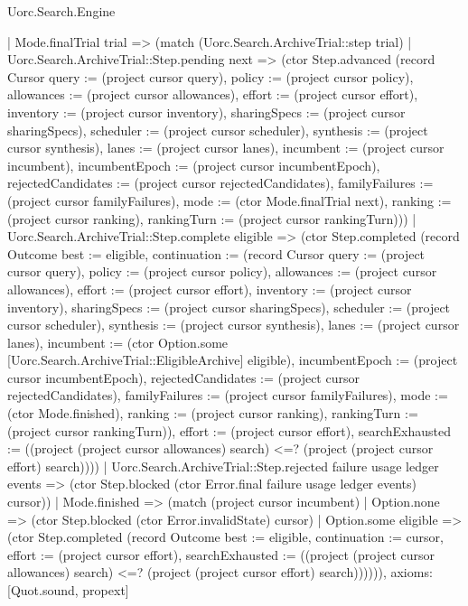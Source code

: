 \begin{lexlean}{Uorc.Search.Engine}
\begin{semanticmodule}
{    | Mode.finalTrial trial => (match (Uorc.Search.ArchiveTrial::step trial)
      | Uorc.Search.ArchiveTrial::Step.pending next => (ctor Step.advanced (record Cursor {query := (project cursor query), policy := (project cursor policy), allowances := (project cursor allowances), effort := (project cursor effort), inventory := (project cursor inventory), sharingSpecs := (project cursor sharingSpecs), scheduler := (project cursor scheduler), synthesis := (project cursor synthesis), lanes := (project cursor lanes), incumbent := (project cursor incumbent), incumbentEpoch := (project cursor incumbentEpoch), rejectedCandidates := (project cursor rejectedCandidates), familyFailures := (project cursor familyFailures), mode := (ctor Mode.finalTrial next), ranking := (project cursor ranking), rankingTurn := (project cursor rankingTurn)}))
      | Uorc.Search.ArchiveTrial::Step.complete eligible => (ctor Step.completed (record Outcome {best := eligible, continuation := (record Cursor {query := (project cursor query), policy := (project cursor policy), allowances := (project cursor allowances), effort := (project cursor effort), inventory := (project cursor inventory), sharingSpecs := (project cursor sharingSpecs), scheduler := (project cursor scheduler), synthesis := (project cursor synthesis), lanes := (project cursor lanes), incumbent := (ctor Option.some [Uorc.Search.ArchiveTrial::EligibleArchive] eligible), incumbentEpoch := (project cursor incumbentEpoch), rejectedCandidates := (project cursor rejectedCandidates), familyFailures := (project cursor familyFailures), mode := (ctor Mode.finished), ranking := (project cursor ranking), rankingTurn := (project cursor rankingTurn)}), effort := (project cursor effort), searchExhausted := ((project (project cursor allowances) search) <=? (project (project cursor effort) search))}))
      | Uorc.Search.ArchiveTrial::Step.rejected failure usage ledger events => (ctor Step.blocked (ctor Error.final failure usage ledger events) cursor))
    | Mode.finished => (match (project cursor incumbent)
      | Option.none => (ctor Step.blocked (ctor Error.invalidState) cursor)
      | Option.some eligible => (ctor Step.completed (record Outcome {best := eligible, continuation := cursor, effort := (project cursor effort), searchExhausted := ((project (project cursor allowances) search) <=? (project (project cursor effort) search))})))),
  axioms: [Quot.sound, propext]
}


\end{semanticmodule}
\end{lexlean}
